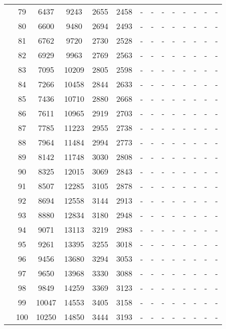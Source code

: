 \begin{table}[htb]
{\begin{tabular}{|c|c|c|c|c|c|c|c|c|c|c|c|c|c|}
 & 
79 & 6437 & 9243 & 2655 & 2458
 & - & -
 & - & -
 & - & -
 & - & -
 \\
 & 
80 & 6600 & 9480 & 2694 & 2493
 & - & -
 & - & -
 & - & -
 & - & -
 \\
 & 
81 & 6762 & 9720 & 2730 & 2528
 & - & -
 & - & -
 & - & -
 & - & -
 \\
 & 
82 & 6929 & 9963 & 2769 & 2563
 & - & -
 & - & -
 & - & -
 & - & -
 \\
 & 
83 & 7095 & 10209 & 2805 & 2598
 & - & -
 & - & -
 & - & -
 & - & -
 \\
 & 
84 & 7266 & 10458 & 2844 & 2633
 & - & -
 & - & -
 & - & -
 & - & -
 \\
 & 
85 & 7436 & 10710 & 2880 & 2668
 & - & -
 & - & -
 & - & -
 & - & -
 \\
 & 
86 & 7611 & 10965 & 2919 & 2703
 & - & -
 & - & -
 & - & -
 & - & -
 \\
 & 
87 & 7785 & 11223 & 2955 & 2738
 & - & -
 & - & -
 & - & -
 & - & -
 \\
 & 
88 & 7964 & 11484 & 2994 & 2773
 & - & -
 & - & -
 & - & -
 & - & -
 \\
 & 
89 & 8142 & 11748 & 3030 & 2808
 & - & -
 & - & -
 & - & -
 & - & -
 \\
 & 
90 & 8325 & 12015 & 3069 & 2843
 & - & -
 & - & -
 & - & -
 & - & -
 \\
 & 
91 & 8507 & 12285 & 3105 & 2878
 & - & -
 & - & -
 & - & -
 & - & -
 \\
 & 
92 & 8694 & 12558 & 3144 & 2913
 & - & -
 & - & -
 & - & -
 & - & -
 \\
 & 
93 & 8880 & 12834 & 3180 & 2948
 & - & -
 & - & -
 & - & -
 & - & -
 \\
 & 
94 & 9071 & 13113 & 3219 & 2983
 & - & -
 & - & -
 & - & -
 & - & -
 \\
 & 
95 & 9261 & 13395 & 3255 & 3018
 & - & -
 & - & -
 & - & -
 & - & -
 \\
 & 
96 & 9456 & 13680 & 3294 & 3053
 & - & -
 & - & -
 & - & -
 & - & -
 \\
 & 
97 & 9650 & 13968 & 3330 & 3088
 & - & -
 & - & -
 & - & -
 & - & -
 \\
 & 
98 & 9849 & 14259 & 3369 & 3123
 & - & -
 & - & -
 & - & -
 & - & -
 \\
 & 
99 & 10047 & 14553 & 3405 & 3158
 & - & -
 & - & -
 & - & -
 & - & -
 \\
 & 
100 & 10250 & 14850 & 3444 & 3193
 & - & -
 & - & -
 & - & -
 & - & -
 \\
\hline
\end{tabular}}
\end{table}